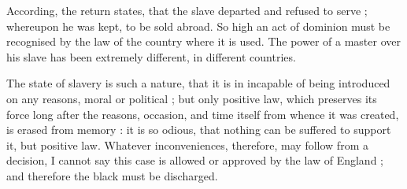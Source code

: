 \documentclass[a4paper]{article}
\begin{document}
According, the return states, that the slave departed and refused to serve ; whereupon he was kept, to be sold abroad. So high an act of dominion must be recognised by the law of the country where it is used. The power of a master over his slave has been extremely different, in different countries. 

The state of slavery is such a nature, that it is in incapable of being introduced on any reasons, moral or political ; but only positive law, which preserves its force long after the reasons, occasion, and time itself from whence it was created, is erased from memory : it is so odious, that nothing can be suffered to support it, but positive law. Whatever inconveniences, therefore, may follow from a decision, I cannot say this case is allowed or approved by the law of England ; and therefore the black must be discharged.
\end{document}

